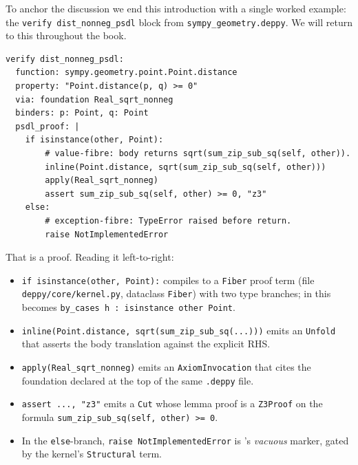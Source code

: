To anchor the discussion we end this introduction with a single
worked example: the \texttt{verify dist\_nonneg\_psdl} block from
\texttt{sympy\_geometry.deppy}.  We will return to this throughout
the book.

\begin{lstlisting}[language=deppyfile,caption={The
\texttt{dist\_nonneg\_psdl} block, taken verbatim from
\texttt{sympy\_geometry.deppy} (top of repository).}]
verify dist_nonneg_psdl:
  function: sympy.geometry.point.Point.distance
  property: "Point.distance(p, q) >= 0"
  via: foundation Real_sqrt_nonneg
  binders: p: Point, q: Point
  psdl_proof: |
    if isinstance(other, Point):
        # value-fibre: body returns sqrt(sum_zip_sub_sq(self, other)).
        inline(Point.distance, sqrt(sum_zip_sub_sq(self, other)))
        apply(Real_sqrt_nonneg)
        assert sum_zip_sub_sq(self, other) >= 0, "z3"
    else:
        # exception-fibre: TypeError raised before return.
        raise NotImplementedError
\end{lstlisting}

That is a \PSDL{} proof.  Reading it left-to-right:

\begin{itemize}[leftmargin=1.7em]
  \item \texttt{if isinstance(other, Point):} compiles to a
    \texttt{Fiber} proof term (file
    \texttt{deppy/core/kernel.py}, dataclass
    \texttt{Fiber}) with two type branches; in \Lean{} this becomes
    \texttt{by\_cases h : isinstance other Point}.

  \item \texttt{inline(Point.distance, sqrt(sum\_zip\_sub\_sq(...)))}
    emits an \texttt{Unfold} that asserts the body translation against
    the explicit RHS.

  \item \texttt{apply(Real\_sqrt\_nonneg)} emits an
    \texttt{AxiomInvocation} that cites the foundation declared at the
    top of the same \texttt{.deppy} file.

  \item \texttt{assert ..., "z3"} emits a \texttt{Cut} whose
    lemma proof is a \texttt{Z3Proof} on the formula
    \texttt{sum\_zip\_sub\_sq(self, other) >= 0}.

  \item In the \texttt{else}-branch, \texttt{raise NotImplementedError}
    is \PSDL's \emph{vacuous} marker, gated by the kernel's
    \texttt{Structural} term.
\end{itemize}

